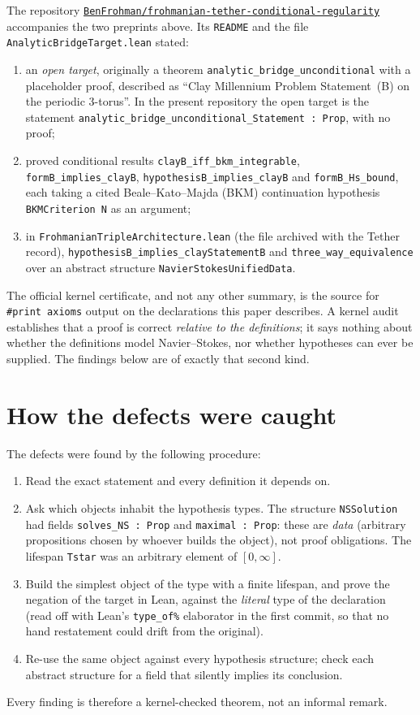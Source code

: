 \documentclass[11pt]{article}
\theoremstyle{definition}
\newcommand{\lean}[1]{\texttt{#1}}
\begin{document}
The repository
\href{https://github.com/BenFrohman/frohmanian-tether-conditional-regularity}{\texttt{BenFrohman/frohmanian-tether-conditional-regularity}}
accompanies the two preprints above. Its \lean{README} and the file
\lean{AnalyticBridgeTarget.lean} stated:
\begin{enumerate}
\item an \emph{open target}, originally a theorem \lean{analytic\_bridge\_unconditional}
with a placeholder proof, described as
``Clay Millennium Problem Statement~(B) on the periodic 3-torus''. In the present
repository the open target is the statement
\lean{analytic\_bridge\_unconditional\_Statement : Prop}, with no proof;
\item proved conditional results \lean{clayB\_iff\_bkm\_integrable},
\lean{formB\_implies\_clayB}, \lean{hypothesisB\_implies\_clayB} and
\lean{formB\_Hs\_bound}, each taking a cited Beale--Kato--Majda (BKM) continuation
hypothesis \lean{BKMCriterion N} as an argument;
\item in \lean{FrohmanianTripleArchitecture.lean} (the file archived with the Tether
record), \lean{hypothesisB\_implies\_clayStatementB} and \lean{three\_way\_equivalence}
over an abstract structure \lean{NavierStokesUnifiedData}.
\end{enumerate}
The official kernel certificate, and not any other summary, is the source for
\lean{\#print axioms} output on the declarations this paper describes. A kernel audit
establishes that a proof is correct \emph{relative to the definitions}; it says nothing
about whether the definitions model Navier--Stokes, nor whether hypotheses can ever be
supplied. The findings below are of exactly that second kind.

\section{How the defects were caught}

The defects were found by the following procedure:
\begin{enumerate}
\item Read the exact statement and every definition it depends on.
\item Ask which objects inhabit the hypothesis types. The structure \lean{NSSolution}
had fields \lean{solves\_NS : Prop} and \lean{maximal : Prop}: these are \emph{data}
(arbitrary propositions chosen by whoever builds the object), not proof obligations.
The lifespan \lean{Tstar} was an arbitrary element of $[0,\infty]$.
\item Build the simplest object of the type with a finite lifespan, and prove the
negation of the target in Lean, against the \emph{literal} type of the declaration
(read off with Lean's \lean{type\_of\%} elaborator in the first commit, so that no
hand restatement could drift from the original).
\item Re-use the same object against every hypothesis structure; check each abstract
structure for a field that silently implies its conclusion.
\end{enumerate}
Every finding is therefore a kernel-checked theorem, not an informal remark.
\end{document}
